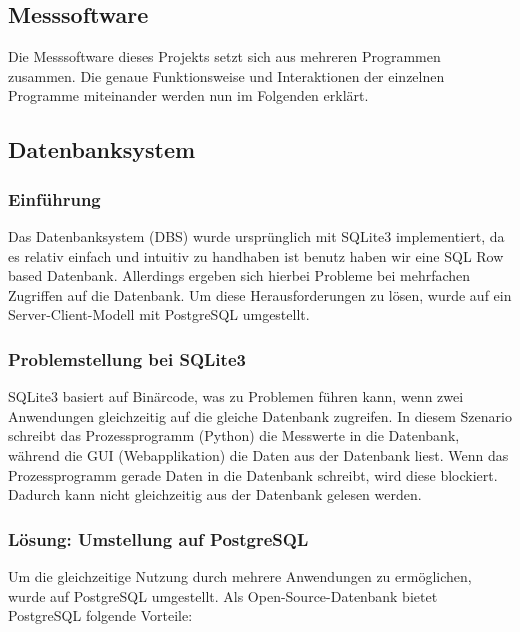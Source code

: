 

\subsection{Messsoftware}
\label{subsec:messsoftware}

Die Messsoftware dieses Projekts setzt sich aus mehreren Programmen zusammen.
Die genaue Funktionsweise und Interaktionen der einzelnen Programme miteinander werden nun im Folgenden erklärt.


\subsection{Datenbanksystem}
\label{subsec:datenbanksystem}


\subsubsection{Einführung}

Das Datenbanksystem (DBS) wurde ursprünglich mit SQLite3 implementiert, da es relativ einfach und intuitiv zu handhaben ist benutz haben wir eine SQL Row based Datenbank. Allerdings ergeben sich hierbei Probleme bei mehrfachen Zugriffen auf die Datenbank. Um diese Herausforderungen zu lösen, wurde auf ein Server-Client-Modell mit PostgreSQL umgestellt.


\subsubsection{Problemstellung bei SQLite3}

SQLite3 basiert auf Binärcode, was zu Problemen führen kann, wenn zwei Anwendungen gleichzeitig auf die gleiche Datenbank zugreifen. In diesem Szenario schreibt das Prozessprogramm (Python) die Messwerte in die Datenbank, während die GUI (Webapplikation) die Daten aus der Datenbank liest. Wenn das Prozessprogramm gerade Daten in die Datenbank schreibt, wird diese blockiert. Dadurch kann nicht gleichzeitig aus der Datenbank gelesen werden.


\subsubsection{Lösung: Umstellung auf PostgreSQL}

Um die gleichzeitige Nutzung durch mehrere Anwendungen zu ermöglichen, wurde auf PostgreSQL umgestellt. Als Open-Source-Datenbank bietet PostgreSQL folgende Vorteile:

